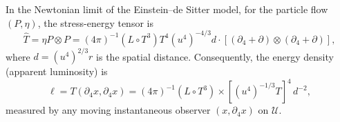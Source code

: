 In the Newtonian limit of the Einstein--de Sitter model, for the particle flow $(P,\eta)$, the stress-energy tensor is
$$\hat{T} = \eta P \otimes P = (4\pi)^{-1}(L \circ T^{3}) T^{4} (u^{4})^{-4/3} d \cdot [(\partial_{4} + \partial) \otimes (\partial_{4} + \partial)],$$
where $d = (u^{4})^{2/3} r$ is the spatial distance. Consequently, the energy density (apparent luminosity) is
$$\ell = T(\partial_{4} x, \partial_{4} x) = (4\pi)^{-1}(L \circ T^{3}) \times [(u^{4})^{-1/3} T]^{4} \, d^{-2},$$
measured by any moving instantaneous observer $(x, \partial_{4} x)$ on $\mathcal{U}$.
